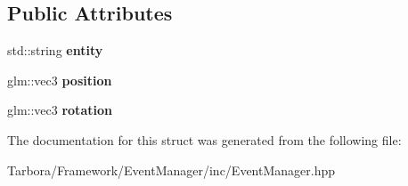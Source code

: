 \subsection*{Public Attributes}
\begin{DoxyCompactItemize}
\item 
\mbox{\label{structTarbora_1_1CreateActorEvent_af4d0600dc731b1cc9c5ea06af552751d}} 
std\+::string {\bfseries entity}
\item 
\mbox{\label{structTarbora_1_1CreateActorEvent_a89f9e524e647827b972fbf11da396f30}} 
glm\+::vec3 {\bfseries position}
\item 
\mbox{\label{structTarbora_1_1CreateActorEvent_ae128425608234d69592ef51fdb54561f}} 
glm\+::vec3 {\bfseries rotation}
\end{DoxyCompactItemize}


The documentation for this struct was generated from the following file\+:\begin{DoxyCompactItemize}
\item 
Tarbora/\+Framework/\+Event\+Manager/inc/Event\+Manager.\+hpp\end{DoxyCompactItemize}

